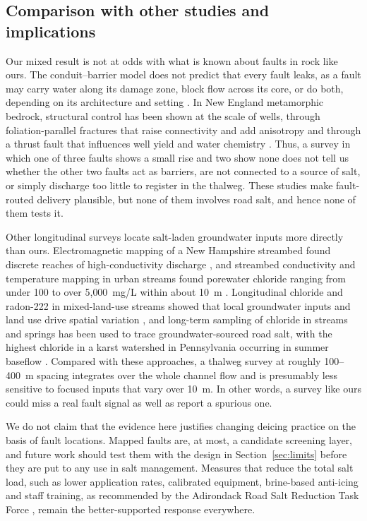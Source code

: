 \documentclass{article}
\begin{document}
\subsection{Comparison with other studies and implications}

Our mixed result is not at odds with what is known about faults in rock like ours. The conduit--barrier model does not predict that every fault leaks, as a fault may carry water along its damage zone, block flow across its core, or do both, depending on its architecture and setting \citep{caine1996,bense2013}. In New England metamorphic bedrock, structural control has been shown at the scale of wells, through foliation-parallel fractures that raise connectivity and add anisotropy \citep{manda2008} and through a thrust fault that influences well yield and water chemistry \citep{kim2014}. Thus, a survey in which one of three faults shows a small rise and two show none does not tell us whether the other two faults act as barriers, are not connected to a source of salt, or simply discharge too little to register in the thalweg. These studies make fault-routed delivery plausible, but none of them involves road salt, and hence none of them tests it.

Other longitudinal surveys locate salt-laden groundwater inputs more directly than ours. Electromagnetic mapping of a New Hampshire streambed found discrete reaches of high-conductivity discharge \citep{harte2010}, and streambed conductivity and temperature mapping in urban streams found porewater chloride ranging from under 100 to over 5{,}000~mg/L within about 10~m \citep{hodgins2024}. Longitudinal chloride and radon-222 in mixed-land-use streams showed that local groundwater inputs and land use drive spatial variation \citep{hodgins2026}, and long-term sampling of chloride in streams and springs has been used to trace groundwater-sourced road salt, with the highest chloride in a karst watershed in Pennsylvania occurring in summer baseflow \citep{orr2026}. Compared with these approaches, a thalweg survey at roughly 100--400~m spacing integrates over the whole channel flow and is presumably less sensitive to focused inputs that vary over 10~m. In other words, a survey like ours could miss a real fault signal as well as report a spurious one.

We do not claim that the evidence here justifies changing deicing practice on the basis of fault locations. Mapped faults are, at most, a candidate screening layer, and future work should test them with the design in Section~\ref{sec:limits} before they are put to any use in salt management. Measures that reduce the total salt load, such as lower application rates, calibrated equipment, brine-based anti-icing and staff training, as recommended by the Adirondack Road Salt Reduction Task Force \citep{adirondack2023}, remain the better-supported response everywhere.
\end{document}
